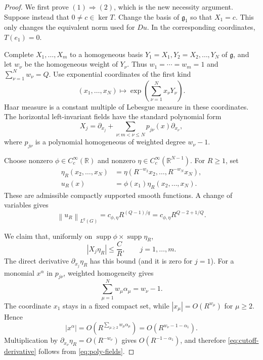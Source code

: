 \documentclass[11pt]{article}
\newcommand{\R}{\mathbb R}
\newcommand{\norm}[1]{\left\lVert#1\right\rVert}
\begin{document}
\begin{proof}
We first prove $(1)\Rightarrow(2)$, which is the new necessity argument.
Suppose instead that $0\ne c\in\ker T$.  Change the basis of
$\mathfrak g_1$ so that $X_1=c$.  This only changes the equivalent norm used
for $Du$.  In the corresponding coordinates, $T(e_1)=0$.

Complete $X_1,\ldots,X_m$ to a homogeneous basis
$Y_1=X_1,Y_2=X_2,\ldots,Y_N$ of $\mathfrak g$, and let $w_\nu$ be the
homogeneous weight of $Y_\nu$.  Thus $w_1=\cdots=w_m=1$ and
$\sum_{\nu=1}^Nw_\nu=Q$.  Use exponential coordinates of the first kind
\[
 (x_1,\ldots,x_N)\longmapsto
 \exp\left(\sum_{\nu=1}^Nx_\nu Y_\nu\right).
\]
Haar measure is a constant multiple of Lebesgue measure in these coordinates.
The horizontal left-invariant fields have the standard polynomial form
\begin{equation}\label{eq:poly-fields}
 X_j=\partial_{x_j}+
 \sum_{\nu:m<\nu\le N}p_{j\nu}(x)\partial_{x_\nu},
\end{equation}
where $p_{j\nu}$ is a polynomial homogeneous of weighted degree
$w_\nu-1$.

Choose nonzero $\phi\in C_c^\infty(\R)$ and nonzero
$\eta\in C_c^\infty(\R^{N-1})$.  For $R\ge1$, set
\begin{align*}
 \eta_R(x_2,\ldots,x_N)
  &=\eta(R^{-w_2}x_2,\ldots,R^{-w_N}x_N),\\
 u_R(x)&=\phi(x_1)\eta_R(x_2,\ldots,x_N).
\end{align*}
These are admissible compactly supported smooth functions.  A change of
variables gives
\begin{equation}\label{eq:left-growth}
 \norm{u_R}_{L^q(G)}
 =c_{\phi,\eta}R^{(Q-1)/q}
 =c_{\phi,\eta}R^{Q-2+1/Q}.
\end{equation}

We claim that, uniformly on $\operatorname{supp}\phi\times
\operatorname{supp}\eta_R$,
\begin{equation}\label{eq:cutoff-derivative}
 |X_j\eta_R|\le \frac{C}{R},\qquad j=1,\ldots,m.
\end{equation}
The direct derivative $\partial_{x_j}\eta_R$ has this bound (and it is zero
for $j=1$).  For a monomial $x^\alpha$ in $p_{j\nu}$, weighted homogeneity
gives
\[
 \sum_{\mu=1}^Nw_\mu\alpha_\mu=w_\nu-1.
\]
The coordinate $x_1$ stays in a fixed compact set, while
$|x_\mu|=O(R^{w_\mu})$ for $\mu\ge2$.  Hence
\[
 |x^\alpha|=O\left(
 R^{\sum_{\mu\ge2}w_\mu\alpha_\mu}\right)
 =O(R^{w_\nu-1-\alpha_1}).
\]
Multiplication by
$\partial_{x_\nu}\eta_R=O(R^{-w_\nu})$ gives $O(R^{-1-\alpha_1})$,
and therefore \eqref{eq:cutoff-derivative} follows from
\eqref{eq:poly-fields}.


\end{proof}
\end{document}
